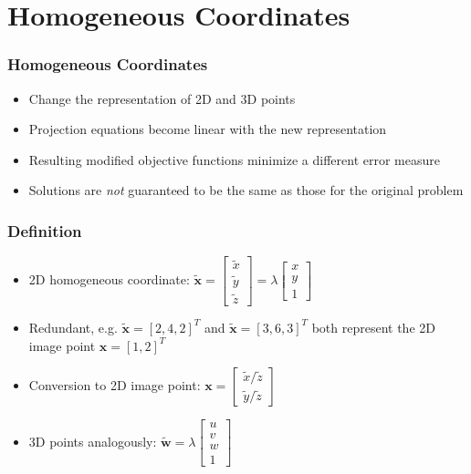 \documentclass{beamer}
\begin{document}
\section{Homogeneous Coordinates}

\begin{frame}
  \frametitle{Homogeneous Coordinates}
  \begin{itemize}[<+->]
    \item Change the representation of 2D and 3D points
    \item Projection equations become linear with the new representation
    \item Resulting modified objective functions minimize a different
      error measure
    \item Solutions are \emph{not} guaranteed to be the same as those for the
      original problem
  \end{itemize}
\end{frame}

\begin{frame}
  \frametitle{Definition}
  \begin{itemize}[<+->]
    \item 2D homogeneous coordinate: $
    \mathbf{\tilde{x}} =
    \begin{bmatrix}
      \tilde{x} \\ \tilde{y} \\ \tilde{z}
    \end{bmatrix}
      = \lambda
    \begin{bmatrix}
      x \\ y \\ 1
    \end{bmatrix}$
  \item Redundant, e.g. $\mathbf{\tilde{x}} = [2,4,2]^T$ and
  $\mathbf{\tilde{x}} = [3,6,3]^T$ both represent the 2D image point
  $\mathbf{x} = [1,2]^T$
\item Conversion to 2D image point: $\mathbf{x} = \begin{bmatrix}
    \tilde{x}/\tilde{z} \\ \tilde{y}/\tilde{z}
  \end{bmatrix}
  $
\item 3D points analogously: $
    \mathbf{\tilde{w}} =
      \lambda
    \begin{bmatrix}
      u \\ v \\ w \\ 1
    \end{bmatrix}$
\end{itemize}
\end{frame}
\end{document}
